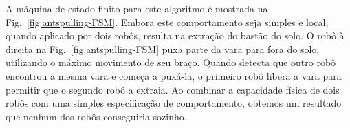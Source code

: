 
A máquina de estado finito para este algoritmo é mostrada na Fig.~\ref{fig.antspulling-FSM}. Embora este comportamento seja simples e local, quando aplicado por dois robôs, resulta na extração do bastão do solo. O robô à direita na Fig.~\ref{fig.antspulling-FSM} puxa parte da vara para fora do solo, utilizando o máximo movimento de seu braço. Quando detecta que outro robô encontrou a mesma vara e começa a puxá-la, o primeiro robô libera a vara para permitir que o segundo robô a extraia. Ao combinar a capacidade física de dois robôs com uma simples especificação de comportamento, obtemos um resultado que nenhum dos robôs conseguiria sozinho.

